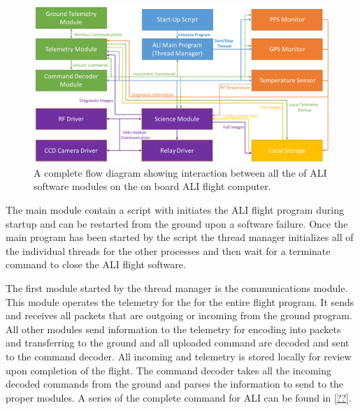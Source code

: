 \begin{figure}[h!]
        \centering
        \includegraphics[width=1.0\textwidth]{./Images/3-3-SoftwareFlowDiagram.pdf}
        \caption[ALI Software Flow Diagram]{A complete flow diagram showing interaction between all the of ALI software modules on the on board ALI flight computer.}
        \label{fig:3.3:softwareFlowDiagram}
\end{figure}

The main module contain a script with initiates the ALI flight program during startup and can be restarted from the ground upon a software failure. Once the main program has been started by the script the thread manager initializes all of the individual threads for the other processes and then wait for a terminate command to close the ALI flight software.

The first module started by the thread manager is the communications module. This module operates the telemetry for the for the entire flight program. It sends and receives all packets that are outgoing or incoming from the ground program. All other modules send information to the telemetry for encoding into packets and transferring to the ground and all uploaded command are decoded and sent to the command decoder. All incoming and telemetry is stored locally for review upon completion of the flight. The command decoder takes all the incoming decoded commands from the ground and parses the information to send to the proper modules. A series of the complete command for ALI can be found in \autoref{??}.

